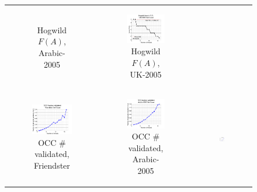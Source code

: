 \begin{figure}[ht]
\begin{tabular}{ccc}
\begin{subfigure}[b]{0.31\textwidth}
			\caption{Hogwild $F(A)$, Arabic-2005}
			\label{appfig:diffFA_Hogwild_arabic2005_setcover}
	  \end{subfigure} &
	  \begin{subfigure}[b]{0.31\textwidth}
	  	\includegraphics[width=150pt]{images/diffFA_Hogwild_uk2005_setcover.png}
			\caption{Hogwild $F(A)$, UK-2005}
			\label{appfig:diffFA_Hogwild_uk2005_setcover}
	  \end{subfigure} \\
	  \begin{subfigure}[b]{0.31\textwidth}
	  	\includegraphics[width=150pt]{images/validated_OCC_friendster10M_setcover.png}
			\caption{OCC \# validated, Friendster}
			\label{appfig:validated_OCC_friendster10M_setcover}
	  \end{subfigure} &
	  \begin{subfigure}[b]{0.31\textwidth}
	  	\includegraphics[width=150pt]{images/validated_OCC_arabic2005_setcover.png}
			\caption{OCC \# validated, Arabic-2005}
			\label{appfig:validated_OCC_arabic2005_setcover}
	  \end{subfigure} &
	  \begin{subfigure}[b]{0.31\textwidth}
	  	\includegraphics[width=150pt]{images/validated_OCC_uk2005_setcover.png}

\end{subfigure}
\end{tabular}
\end{figure}
